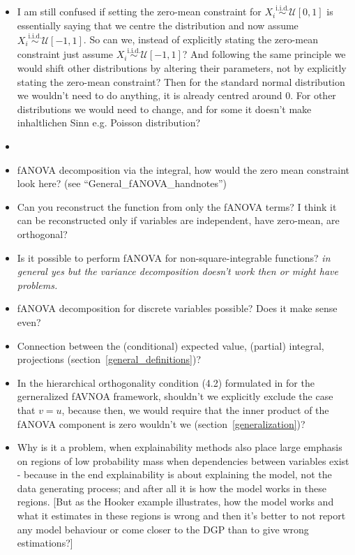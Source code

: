 \begin{itemize}
    \item I am still confused if setting the zero-mean constraint for $X_i \overset{\text{i.i.d.}}{\sim} \mathcal{U}[0, 1]$ is essentially saying that we centre the distribution and now assume $X_i \overset{\text{i.i.d.}}{\sim} \mathcal{U}[-1, 1]$. So can we, instead of explicitly stating the zero-mean constraint just assume $X_i \overset{\text{i.i.d.}}{\sim} \mathcal{U}[-1, 1]$? And following the same principle we would shift other distributions by altering their parameters, not by explicitly stating the zero-mean constraint? Then for the standard normal distribution we wouldn't need to do anything, it is already centred around 0. For other distributions we would need to change, and for some it doesn't make inhaltlichen Sinn e.g. Poisson distribution?
    \item 
    \item fANOVA decomposition via the integral, how would the zero mean constraint look here? (see ``General\_fANOVA\_handnotes'')
    \item Can you reconstruct the function from only the fANOVA terms? I think it can be reconstructed only if variables are independent, have zero-mean, are orthogonal?
    \item Is it possible to perform fANOVA for non-square-integrable functions? \textit{in general yes but the variance decomposition doesn't work then or might have problems.}
    \item fANOVA decomposition for discrete variables possible? Does it make sense even?
    \item Connection between the (conditional) expected value, (partial) integral, projections (section~\ref{general_definitions})?
    \item In the hierarchical orthogonality condition (4.2) formulated in \cite{hooker2007} for the gerneralized fAVNOA framework, shouldn't we explicitly exclude the case that $v = u$, because then, we would require that the inner product of the fANOVA component is zero wouldn't we (section~\ref{generalization})?
    \item Why is it a problem, when explainability methods also place large emphasis on regions of low probability mass when dependencies between variables exist - because in the end explainability is about explaining the model, not the data generating process; and after all it is how the model works in these regions. [But as the Hooker example illustrates, how the model works and what it estimates in these regions is wrong and then it's better to not report any model behaviour or come closer to the DGP than to give wrong estimations?]

\end{itemize}
